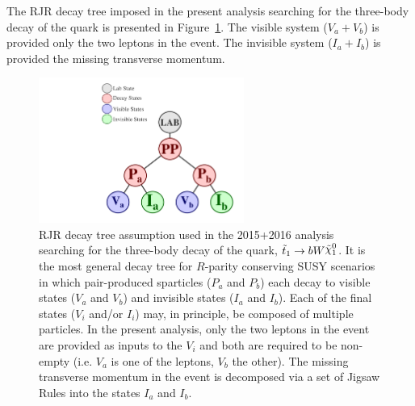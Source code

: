 \FloatBarrier
%
%

The RJR decay tree imposed in the present analysis searching for the three-body decay
of the \stopone quark is presented in Figure~\ref{fig:rjr_stop}.
The visible system ($V_a + V_b$) is provided only the two leptons in the event.
The invisible system ($I_a + I_b$) is provided the missing transverse momentum.

\begin{figure}[!htb]
    \begin{center}
        \includegraphics[width=0.6\textwidth]{figures/search_stop2l/strategy/RJRtree_DiSparticle}
        \caption{
            RJR decay tree assumption used in the 2015+2016 analysis searching for the
            three-body decay of the \stopone quark, $\stopone \rightarrow b W \ninoone$.
            It is the most general decay tree for $R$-parity conserving SUSY scenarios in
            which pair-produced sparticles ($P_a$ and $P_b$) each decay to visible states ($V_a$ and $V_b$)
            and invisible states ($I_a$ and $I_b$).
            Each of the final states ($V_i$ and/or $I_i$) may, in principle, be composed of multiple particles.
            In the present analysis, only the two leptons in the event are provided as inputs to the $V_i$ and both
            are required to be non-empty (i.e. $V_a$ is one of the leptons, $V_b$ the other).
            The missing transverse momentum in the event is decomposed via a set of Jigsaw Rules into the
            states $I_a$ and $I_b$.
        }
        \label{fig:rjr_stop}
    \end{center}
\end{figure}

